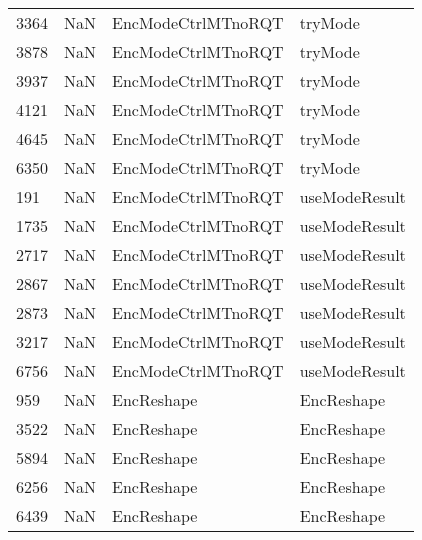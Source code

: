 \begin{tabular}{llll}
3364 &                   NaN &         EncModeCtrlMTnoRQT &                                   tryMode \\
3878 &                   NaN &         EncModeCtrlMTnoRQT &                                   tryMode \\
3937 &                   NaN &         EncModeCtrlMTnoRQT &                                   tryMode \\
4121 &                   NaN &         EncModeCtrlMTnoRQT &                                   tryMode \\
4645 &                   NaN &         EncModeCtrlMTnoRQT &                                   tryMode \\
6350 &                   NaN &         EncModeCtrlMTnoRQT &                                   tryMode \\
191  &                   NaN &         EncModeCtrlMTnoRQT &                             useModeResult \\
1735 &                   NaN &         EncModeCtrlMTnoRQT &                             useModeResult \\
2717 &                   NaN &         EncModeCtrlMTnoRQT &                             useModeResult \\
2867 &                   NaN &         EncModeCtrlMTnoRQT &                             useModeResult \\
2873 &                   NaN &         EncModeCtrlMTnoRQT &                             useModeResult \\
3217 &                   NaN &         EncModeCtrlMTnoRQT &                             useModeResult \\
6756 &                   NaN &         EncModeCtrlMTnoRQT &                             useModeResult \\
959  &                   NaN &                 EncReshape &                                EncReshape \\
3522 &                   NaN &                 EncReshape &                                EncReshape \\
5894 &                   NaN &                 EncReshape &                                EncReshape \\
6256 &                   NaN &                 EncReshape &                                EncReshape \\
6439 &                   NaN &                 EncReshape &                                EncReshape \\

\end{tabular}
